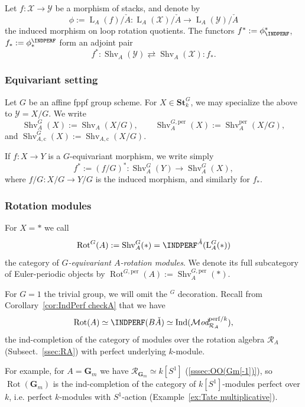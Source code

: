 \documentclass[12pt, oneside]{amsart}
\numberwithin{equation}{section}
\theoremstyle{remark}
\theoremstyle{plain}
\newcommand{\MOD}{\mathcal{M}\textit{od}}
\newcommand{\R}{\mathcal{R}}
\newcommand{\RA}{\R_A}
\newcommand{\Loop}{\operatorname{L}}
\newcommand{\YY}{\mathcal{Y}}
\newcommand{\XX}{\mathcal{X}}
\newcommand{\GGm}{\mathbf{G}_{m}}
\newcommand{\Ind}{\operatorname{Ind}}
\newcommand{\Stk}{\mathbf{St}_{k}}
\newcommand{\Shv}{\operatorname{Shv}}
\newcommand{\Shvper}{\operatorname{Shv}^{\mathrm{per}}}
\newcommand{\Rot}{\operatorname{Rot}}
\begin{document}
Let $f : \XX \to \YY$ be a morphism of stacks, and denote by
\[\phi := \Loop_A(f)/\check{A} : \Loop_A(\XX)/\check{A} \to \Loop_A(\YY)/\check{A}\]
the induced morphism on loop rotation quotients.
The functors $f^{*} := \phi^*_{\INDPERF}$, $f_{*} := \phi_*^{\INDPERF}$ form an adjoint pair
\[
  f^* : \Shv_A(\YY) \rightleftarrows \Shv_A(\XX) : f_*.
\]

\subsubsection{Equivariant setting}

Let $G$ be an affine fppf group scheme.
For $X \in \Stk^G$, we may specialize the above to $\YY = X/G$.
We write
\[
  \Shv_A^G(X) := \Shv_A(X/G), \qquad
  \Shv_A^{G,\mathrm{per}}(X) := \Shvper_A(X/G),
\]
and $\Shv_{A,\mathrm{c}}^G(X) := \Shv_{A,\mathrm{c}}(X/G)$.

If $f : X \to Y$ is a $G$-equivariant morphism, we write simply
\[
  f^* := (f/G)^* : \Shv_A^G(Y) \to \Shv_A^G(X),
\]
where $f/G : X/G \to Y/G$ is the induced morphism, and similarly for $f_*$.

\subsubsection{Rotation modules}

For $X = *$ we call
\[
  \Rot^G(A) := \Shv_A^G(*) = \INDPERF^{\check{A}}(\Loop_A^G(*))
\]
the category of \emph{$G$-equivariant $A$-rotation modules}.
We denote its full subcategory of Euler-periodic objects by $\Rot^{G,\mathrm{per}}(A) := \Shv_A^{G,\mathrm{per}}(*)$.

For $G=1$ the trivial group, we will omit the $^G$ decoration.
Recall from Corollary~\ref{cor:IndPerf checkA} that we have
\[
  \Rot(A) \simeq \INDPERF(B\check{A}) \simeq \Ind(\MOD_{\RA}^{\mathrm{perf}/k}),
\]
the ind-completion of the category of modules over the rotation algebra $\RA$ (Subsect.~\ref{ssec:RA}) with perfect underlying $k$-module.

For example, for $A = \GGm$ we have $\R_{\GGm} \simeq k[S^1]$ (\ref{sssec:OO(Gm[-1])}), so $\Rot(\GGm)$ is the ind-completion of the category of $k[S^1]$-modules perfect over $k$, i.e. perfect $k$-modules with $S^1$-action (Example~\ref{ex:Tate multiplicative}).

\subsubsection{}
\end{document}
